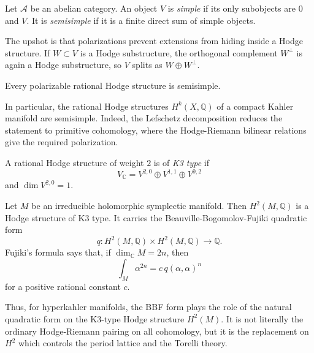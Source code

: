 \documentclass{book}
\begin{document}
\begin{definition}
\label{definition-simple-semisimple-object}
Let $\mathcal{A}$ be an abelian category.
An object $V$ is {\it simple} if its only
subobjects are $0$ and $V$.
It is {\it semisimple} if it is a finite
direct sum of simple objects.
\end{definition}

\noindent
The upshot is that polarizations prevent
extensions from hiding inside a Hodge
structure.
If $W\subset V$ is a Hodge substructure, the
orthogonal complement $W^\perp$ is again a
Hodge substructure, so $V$ splits as
$W\oplus W^\perp$.

\begin{proposition}
\label{proposition-polarizable-hs-semisimple}
Every polarizable rational Hodge structure
is semisimple.
\end{proposition}

\noindent
In particular, the rational Hodge structures
$H^k(X,\mathbb{Q})$ of a compact Kahler
manifold are semisimple.
Indeed, the Lefschetz decomposition reduces
the statement to primitive cohomology, where
the Hodge-Riemann bilinear relations give
the required polarization.

\begin{definition}
\label{definition-k3-type-hodge-structure}
A rational Hodge structure of weight $2$
is of {\it K3 type} if
$$
V_{\mathbb{C}}=
V^{2,0}\oplus V^{1,1}\oplus V^{0,2}
$$
and $\dim V^{2,0}=1$.
\end{definition}

\begin{example}
\label{example-bbf-k3-type}
Let $M$ be an irreducible holomorphic
symplectic manifold.
Then $H^2(M,\mathbb{Q})$ is a Hodge
structure of K3 type.
It carries the Beauville-Bogomolov-Fujiki
quadratic form
$$
q:H^2(M,\mathbb{Q})\times H^2(M,\mathbb{Q})
\longrightarrow \mathbb{Q}.
$$
Fujiki's formula says that, if
$\dim_{\mathbb{C}}M=2n$, then
$$
\int_M\alpha^{2n}=c\,q(\alpha,\alpha)^n
$$
for a positive rational constant $c$.
\end{example}

\noindent
Thus, for hyperkahler manifolds, the BBF
form plays the role of the natural quadratic
form on the K3-type Hodge structure
$H^2(M)$.
It is not literally the ordinary
Hodge-Riemann pairing on all cohomology, but
it is the replacement on $H^2$ which controls
the period lattice and the Torelli theory.
\end{document}
